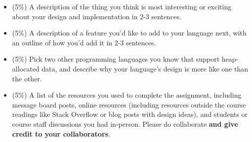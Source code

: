 \documentclass[10pt, oneside]{article}
\begin{document}
\begin{itemize}
  \item (5\%) A description of the thing you think is most interesting or
  exciting about your design and implementation in 2-3 sentences.

  \item (5\%) A description of a feature you'd like to add to your language
  next, with an outline of how you'd add it in 2-3 sentences.

  \item (5\%) Pick two other programming languages you know that support
  heap-allocated data, and describe why your language's design is more like
  one than the other.

  \item (5\%) A list of the resources you used to complete the assignment,
  including message board posts, online resources (including resources
  outside the course readings like Stack Overflow or blog posts with design
  ideas), and students or course staff discussions you had in-person. Please
  do collaborate {\bf and give credit to your collaborators}.

\end{itemize}
\end{document}
